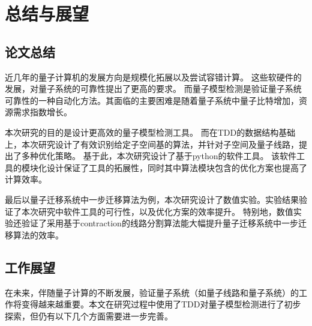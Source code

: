 \chapter{总结与展望}
\section{论文总结}
近几年的量子计算机的发展方向是规模化拓展以及尝试容错计算。
这些软硬件的发展，对量子系统的可靠性提出了更高的要求。
而量子模型检测是验证量子系统可靠性的一种自动化方法。其面临的主要困难是随着量子系统中量子比特增加，资源需求指数增长。

本次研究的目的是设计更高效的量子模型检测工具。
而在TDD的数据结构基础上，本次研究设计了有效识别给定子空间基的算法，并针对子空间及量子线路，提出了多种优化策略。
基于此，本次研究设计了基于python的软件工具。
该软件工具的模块化设计保证了工具的拓展性，同时其中算法模块包含的优化方案也提高了计算效率。

最后以量子迁移系统中一步迁移算法为例，本次研究设计了数值实验。实验结果验证了本次研究中软件工具的可行性，以及优化方案的效率提升。
特别地，数值实验还验证了采用基于contraction的线路分割算法能大幅提升量子迁移系统中一步迁移算法的效率。


\section{工作展望}

在未来，伴随量子计算的不断发展，验证量子系统（如量子线路和量子系统）的工作将变得越来越重要。本文在研究过程中使用了TDD对量子模型检测进行了初步探索，但仍有以下几个方面需要进一步完善。

